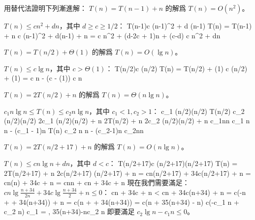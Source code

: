 \startsection[
  title={The substitution method for solving recurrences},
]

\startEXERCISE
用替代法證明下列漸進解：
\startigBase[a]
\startitem
$T(n)=T(n-1)+n$ 的解爲 $T(n)=O(n^2)$。

\startANSWER
$T(n) \le c n^2 + d n$，其中 $d\ge c \ge 1/2$：
\startsplitformula\startmathalignment
\NC T(n-1)\NC \le c (n-1)^2 + d (n-1) \NR
\NC T(n) \NC = T(n-1) + n \NR
\NC \NC \le c (n-1)^2 + d(n-1) + n \NR
\NC \NC = c n^2 + (d-2c + 1)n + (c-d) \NR
\NC \NC \le c n^2 + dn \NR
\stopmathalignment\stopsplitformula
\stopANSWER
\stopitem

\startitem
$T(n)=T(n/2)+\Theta(1)$ 的解爲 $T(n)=O(\lg n)$。

\startANSWER
$T(n)\le c \lg n$，其中 $c>\Theta(1)$：
\startsplitformula\startmathalignment
\NC T(n/2)\NC \le c \lg(n/2) \NR
\NC T(n) \NC = T(n/2) + \Theta(1) \NR
\NC \NC \le c \lg(n/2) + \Theta(1) \NR
\NC \NC = c \lg n - (c - \Theta(1)) \NR
\NC \NC \le c \lg n \NR
\stopmathalignment\stopsplitformula
\stopANSWER
\stopitem

\startitem
$T(n)=2T(n/2)+n$ 的解爲 $T(n)=\Theta(n\lg n)$。

\startANSWER
$c_1 n \lg n \le T(n) \le c_2 n\lg n$，其中 $c_1<1, c_2>1$：
\startsplitformula\startmathalignment[n=3,align={right,middle,left}]
\NC c_1 (n/2)\lg(n/2) \le \NC T(n/2) \NC \le c_2 (n/2)\lg(n/2) \NR
\NC 2c_1 (n/2)\lg(n/2) + n \le \NC 2T(n/2) + n \NC \le 2c_2 (n/2)\lg(n/2) + n \NR
\NC c_1n\lg n \le c_1 n \lg n - (c_1 - 1)n \le
 \NC T(n)
 \NC \le c_2 n \lg n - (c_2-1)n \le c_2n\lg n\NR
\stopmathalignment\stopsplitformula
\stopANSWER
\stopitem

\startitem
$T(n)=2T(n/2+17)+n$ 的解爲 $T(n)=O(n\lg n)$。

\startANSWER
$T(n)\le cn \lg n + dn$，其中 $d < c$：
\startsplitformula\startmathalignment
\NC T(n/2+17)\NC \le c (n/2+17)\lg(n/2+17) \NR
\NC T(n) \NC = 2T(n/2+17) + n \NR
\NC \NC \le 2c(n/2+17) \lg(n/2+17) + n \NR
\NC \NC = cn\lg(n/2+17) + 34c\lg(n/2+17) + n \NR
\NC \NC = cn\lg(n) + 34c\lg{} + n \NR
\NC \NC = cn\lg n + cn\lg{} + 34c\lg{} + n \NR
\stopmathalignment\stopsplitformula
現在我們需要滿足： $cn\lg\frac{n+34}{2n} + 34c\lg\frac{n+34}{2} + n\le 0$：
\startsplitformula\startmathalignment
\NC \NC cn\lg{} + 34c\lg{} + n \NR
\NC < \NC cn\lg{} + 34c\lg(n+34) + n \NR
\NC = \NC c(-n + \lg{} + 34\lg(n+34)) + n\NR
\NC = \NC c(n + \lg{} + 34\lg(n+34))\NR
\NC = \NC c(n + 35\lg(n+34) - \lg n)\NR
\NC \le \NC c(-c_1 n + c_2 \lg n) \qquad
  c_1 = , 35\lg(n+34)-\lg n\le c_2 \lg n\NR
\stopmathalignment\stopsplitformula
即要滿足 $c_2\lg n -c_1 n \le 0$。


